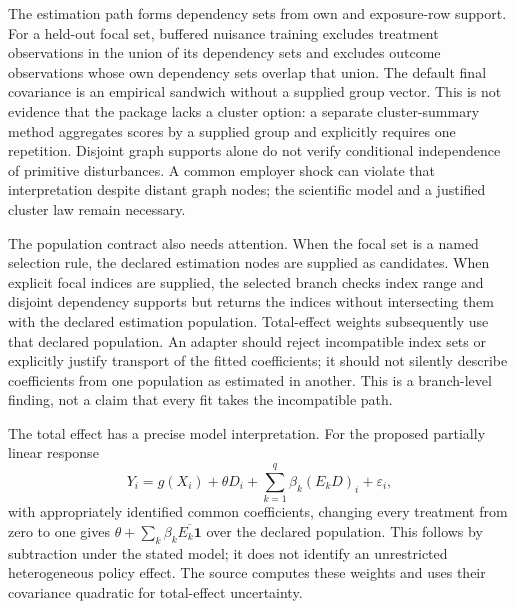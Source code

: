 The estimation path forms dependency sets from own and exposure-row support. For a held-out focal set, buffered nuisance training excludes treatment observations in the union of its dependency sets and excludes outcome observations whose own dependency sets overlap that union. The default final covariance is an empirical sandwich without a supplied group vector. This is not evidence that the package lacks a cluster option: a separate cluster-summary method aggregates scores by a supplied group and explicitly requires one repetition. Disjoint graph supports alone do not verify conditional independence of primitive disturbances. A common employer shock can violate that interpretation despite distant graph nodes; the scientific model and a justified cluster law remain necessary.~\citep{exec25_pnet_dml}

The population contract also needs attention. When the focal set is a named selection rule, the declared estimation nodes are supplied as candidates. When explicit focal indices are supplied, the selected branch checks index range and disjoint dependency supports but returns the indices without intersecting them with the declared estimation population. Total-effect weights subsequently use that declared population. An adapter should reject incompatible index sets or explicitly justify transport of the fitted coefficients; it should not silently describe coefficients from one population as estimated in another. This is a branch-level finding, not a claim that every fit takes the incompatible path.~\citep{exec25_pnet_dml}

The total effect has a precise model interpretation. For the proposed partially linear response
\[
 Y_i=g(X_i)+\theta D_i+\sum_{k=1}^q\beta_k(E_kD)_i+\varepsilon_i,
\]
with appropriately identified common coefficients, changing every treatment from zero to one gives $\theta+\sum_k\beta_k\overline{E_k\mathbf1}$ over the declared population. This follows by subtraction under the stated model; it does not identify an unrestricted heterogeneous policy effect. The source computes these weights and uses their covariance quadratic for total-effect uncertainty.~\citep{exec25_pnet_dml,exec25_pnet_choice}

